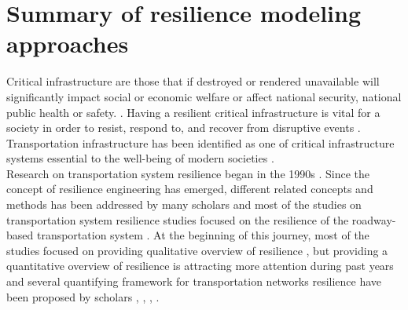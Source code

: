 \documentclass[11pt,twoside]{article}
\numberwithin{equation}{section}
\newcommand{\?}{\stackrel{?}{=}}
\begin{document}
\section{Summary of resilience modeling approaches}
Critical infrastructure are those that if destroyed or rendered unavailable will significantly impact social or economic welfare or affect national security, national public health or safety. \citep{skrlj2019py3plex}. Having a resilient critical infrastructure is vital for a society in order to resist, respond to, and recover from disruptive events \citep{tingting2020transportation}. Transportation infrastructure has been identified as one of critical infrastructure systems essential to the well-being of modern societies \citep{zhang2016resiliencebased}.\\
Research on transportation system resilience began in the 1990s \citep{ahmed2020resilience}. Since the concept of resilience engineering has emerged, different related concepts and methods has been addressed by many scholars  and most of the studies on transportation system resilience studies focused on the resilience of the roadway-based transportation system \citep{ahmed2020resilience}. At the beginning of this journey, most of the studies focused on providing qualitative overview of resilience \citep{baroud2014inherent}, \citep{bhatia2015network} but providing a quantitative overview of resilience is attracting more attention during past years and several quantifying framework for transportation networks resilience have been proposed by scholars \citep{adjetey-bahun2014simulationbased}, \citep{cavallaro2014assessment}, \citep{bhatia2015network}, \citep{donovan2017empirically}.
\end{document}
